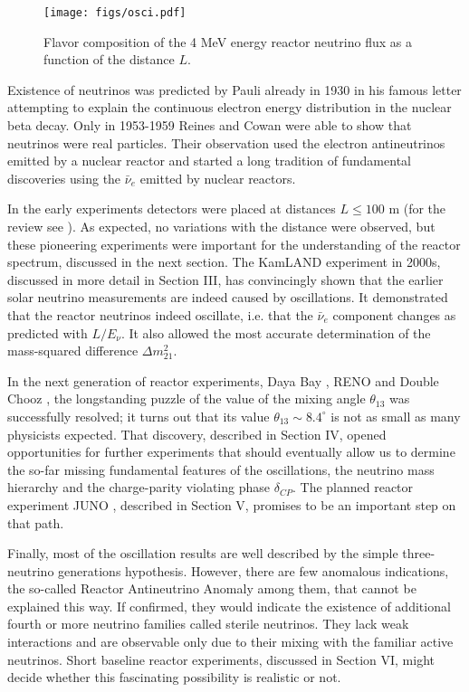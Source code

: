 \begin{figure}[htb]
\begin{centering}
\texttt{[image: figs/osci.pdf]}
\par\end{centering}
\caption{\label{fig:intro1} Flavor composition of the 4 MeV energy reactor neutrino flux as a function of the distance  $L$. }
\end{figure}


Existence of neutrinos was predicted by Pauli already in 1930 \cite{Pauli30} in his famous letter attempting to explain the continuous electron
energy distribution in the nuclear beta decay. Only in 1953-1959 Reines and Cowan \cite{Reines53,Cowan56,Reines59} were able to show that neutrinos
were real particles. Their observation used the electron antineutrinos emitted by a nuclear reactor and started a long tradition of fundamental
discoveries using the $\bar{\nu}_e$ emitted by nuclear reactors.

In the early experiments detectors were placed at distances $L \le 100$ m (for the review see \cite{Bemporad02}). As expected, no variations
with the distance were observed, but these pioneering experiments were important for the understanding of the reactor spectrum, discussed
in the next section. The KamLAND experiment \cite{Kamland03,Kamland05,Kamland08} in 2000s, discussed in more detail in Section III, has convincingly shown that the earlier
solar neutrino measurements are indeed  caused by oscillations. It demonstrated that the reactor neutrinos indeed
oscillate, i.e. that the $\bar{\nu}_e$ component changes as predicted with $L/E_{\nu}$. It also allowed the most accurate determination of the 
mass-squared difference $\Delta m^2_{21}$.  

In the next generation of reactor experiments, Daya Bay \cite{Dayabay,Dayabay14}, RENO \cite{Reno}  and Double Chooz \cite{DChooz,DChooz14}, the longstanding puzzle of the
value of the mixing angle $\theta_{13}$ was successfully resolved; it turns out that its value $\theta_{13} \sim 8.4^\circ$
is not as small as many physicists expected. That discovery, described in Section IV, opened opportunities for further experiments that should  
eventually allow us to dermine the so-far missing fundamental features of the oscillations, the neutrino mass hierarchy and the charge-parity violating phase
$\delta_{CP}$. The planned reactor experiment JUNO \cite{JUNO}, described in Section V,  promises to be an important step on that path.

Finally, most of the oscillation results are well described by the simple three-neutrino generations hypothesis. However, there are few anomalous indications,
the so-called Reactor Antineutrino Anomaly \cite{Mention} among them, that cannot be explained this way. If confirmed, they would indicate the existence of additional
fourth or more neutrino families called sterile neutrinos. They lack  weak interactions and are observable only due to their mixing with the familiar active neutrinos.  Short baseline
reactor experiments, discussed in Section VI, might decide whether this fascinating possibility is realistic or not.
